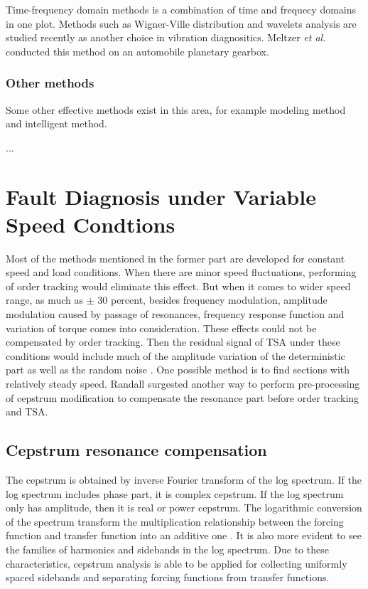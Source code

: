 Time-frequency domain methods is a combination of time and frequecy domains in one plot. Methods such as Wigner-Ville distribution and wavelets analysis are studied recently as another choice in vibration diagnositics. Meltzer \textit{et al.} \cite{mel1} \cite{mel2} conducted this method on an automobile planetary gearbox.

\subsubsection{Other methods}

Some other effective methods exist in this area, for example modeling method and intelligent method.

...

\section{Fault Diagnosis under Variable Speed Condtions}

Most of the methods mentioned in the former part are developed for constant speed and load conditions. When there are minor speed fluctuations, performing of order tracking would eliminate this effect. But when it comes to wider speed range, as much as $\pm$ 30 percent, besides frequency modulation, amplitude modulation caused by passage of resonances, frequency response function and variation of torque comes into consideration. These effects could not be compensated by order tracking. Then the residual signal of TSA under these conditions would include much of the amplitude variation of the deterministic part as well as the random noise \cite{varyspeed}. One possible method is to find sections with relatively steady speed. Randall \cite{varyspeed} surgested another way to perform pre-processing of cepstrum modification to compensate the resonance part before order tracking and TSA.

\subsection{Cepstrum resonance compensation}

The cepstrum is obtained by inverse Fourier transform of the log spectrum. If the log spectrum includes phase part, it is complex cepstrum. If the log spectrum only has amplitude, then it is real or power cepstrum. The logarithmic conversion of the spectrum transform the multiplication relationship between the forcing function and transfer function into an additive one \cite{vbcm}. It is also more evident to see the families of harmonics and sidebands in the log spectrum. Due to these characteristics, cepstrum analysis is able to be applied for collecting uniformly spaced sidebands and separating forcing functions from transfer functions.

